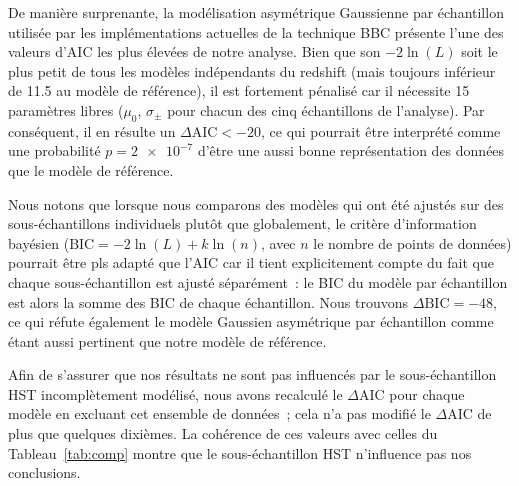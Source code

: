 \documentclass[../main/main.tex]{subfiles}
\begin{document}
De manière surprenante, la modélisation asymétrique Gaussienne par échantillon
utilisée par les implémentations actuelles de la technique BBC
\citep{scolnic2016, kessler2017} présente l'une des valeurs d'AIC les plus
élevées de notre analyse. Bien que son $-2\ln(L)$ soit le plus petit de tous les
modèles indépendants du redshift (mais toujours inférieur de \num{11.5} au
modèle de référence), il est fortement pénalisé car il nécessite 15 paramètres
libres ($\mu_0$, $\sigma_{\pm}$ pour chacun des cinq échantillons de l'analyse).
Par conséquent, il en résulte un $\Delta\mathrm{AIC} < -20$, ce qui pourrait
être interprété comme une probabilité $p = \num{2e-7}$ d'être une aussi bonne
représentation des données que le modèle de référence.

Nous notons que lorsque nous comparons des modèles qui ont été ajustés sur des
sous-échantillons individuels plutôt que globalement, le critère d'information
bayésien ($\mathrm{BIC} = -2\ln(L) + k\ln(n)$, avec $n$ le nombre de points de
données) pourrait être pls adapté que l'AIC car il tient explicitement compte du
fait que chaque sous-échantillon est ajusté séparément~: le BIC du modèle par
échantillon est alors la somme des BIC de chaque échantillon. Nous trouvons
$\Delta\mathrm{BIC} = -48$, ce qui réfute également le modèle Gaussien
asymétrique par échantillon comme étant aussi pertinent que notre modèle de
référence.

Afin de s'assurer que nos résultats ne sont pas influencés par le
sous-échantillon HST incomplètement modélisé, nous avons recalculé le
$\Delta$AIC pour chaque modèle en excluant cet ensemble de données~; cela n'a
pas modifié le $\Delta$AIC de plus que quelques dixièmes. La cohérence de ces
valeurs avec celles du Tableau~\ref{tab:comp} montre que le sous-échantillon HST
n'influence pas nos conclusions.
\end{document}
